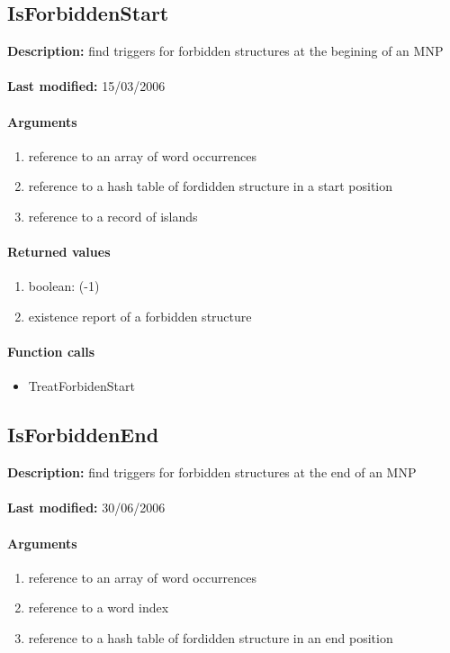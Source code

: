 \subsection{IsForbiddenStart}
\textbf{Description:} find triggers for forbidden structures at the begining of an MNP\\
\\\textbf{Last modified:} 15/03/2006

\paragraph{Arguments}
\begin{enumerate}
\item reference to an array of word occurrences
\item reference to a hash table of fordidden structure in a start position
\item reference to a record of islands
\end{enumerate}

\paragraph{Returned values}
\begin{enumerate}
\item boolean: (-1)
\item existence report  of a forbidden structure
\end{enumerate}

\paragraph{Function calls}
\begin{itemize}
\item TreatForbidenStart
\end{itemize}

\subsection{IsForbiddenEnd}
\textbf{Description:} find triggers for forbidden structures at the end of an MNP\\
\\\textbf{Last modified:} 30/06/2006

\paragraph{Arguments}
\begin{enumerate}
\item reference to an array of word occurrences
\item reference to a word index
\item reference to a hash table of fordidden structure in an end position
\end{enumerate}

